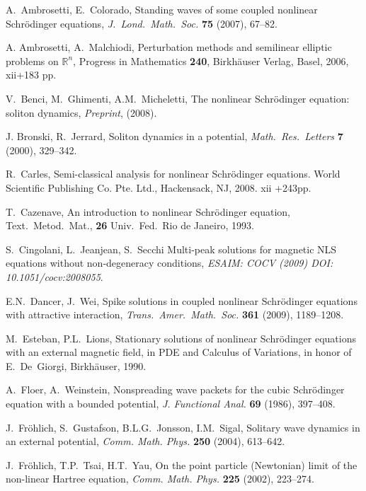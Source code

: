 \documentclass[11pt]{amsart}
\numberwithin{equation}{section}
\theoremstyle{definition}
\begin{document}
\bigskip
\bigskip
\begin{thebibliography}{999999}

{\sc A.~Ambrosetti, E.~Colorado},
Standing waves of some coupled nonlinear Schr\"odinger equations,
{\em J.\ Lond.\ Math.\ Soc.}  {\bf 75} (2007), 67--82.

{\sc A. Ambrosetti, A.~Malchiodi},
Perturbation methods and semilinear elliptic problems on ${{\mathbb R}}^n$,
Progress in Mathematics {\bf 240}, Birkh\"auser Verlag, Basel, 2006, xii+183 pp.

{\sc V.~Benci, M.~Ghimenti, A.M.~Micheletti},
The nonlinear Schr\"odinger equation: soliton dynamics,
{\em Preprint}, (2008).

{\sc J. Bronski, R.~Jerrard},
Soliton dynamics in a potential,
{\em Math.\ Res.\ Letters} {\bf 7} (2000), 329--342.

{\sc R.~Carles},
Semi-classical analysis for nonlinear Schr\"odinger equations.
World Scientific Publishing Co. Pte. Ltd., Hackensack, NJ, 2008. xii +243pp.

{\sc T.~Cazenave},
An introduction to  nonlin\-ear Schr\"o\-din\-ger equation,
Text.\ Metod.\ Mat., {\bf 26} Univ.\ Fed.\ Rio de Janeiro, 1993.

{\sc S.~Cingolani, L.~Jeanjean, S.~Secchi}
Multi-peak solutions for magnetic NLS equations without non-degeneracy conditions,
{\em ESAIM: COCV (2009) DOI: 10.1051/cocv:2008055}.

{\sc E.N.~Dancer, J.~Wei},
Spike solutions in coupled nonlinear Schr\"odinger equations  with attractive interaction,
{\em Trans.\ Amer.\ Math.\ Soc.} {\bf 361} (2009), 1189--1208.

{\sc  M.~Esteban, P.L.~Lions}, Stationary solutions of nonlinear
{S}chr\"{o}dinger equations with an external magnetic field, in PDE
and Calculus of Variations, in honor of E.~De~Giorgi,
Birkh\"{a}user, 1990.

{\sc A.~Floer, A.~Weinstein},
Nonspreading wave packets for the cubic Schr\"odinger equation
with a bounded potential, {\em J. Functional Anal.} {\bf 69} (1986), 397--408.

 {\sc J.~Fr\"ohlich, S.~Gustafson, B.L.G.~Jonsson, I.M.~Sigal},
Solitary wave dynamics in an external potential,
{\em Comm. Math. Phys.} {\bf 250} (2004), 613--642.

 {\sc  J.~Fr\"ohlich, T.P.~Tsai, H.T.~Yau},
On the point particle (Newtonian) limit of the non-linear Hartree equation,
{\em Comm. Math. Phys.} {\bf 225} (2002), 223--274.


\end{thebibliography}
\end{document}
